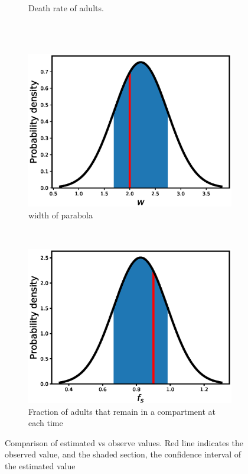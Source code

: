\documentclass[12pt, table]{article}
\begin{document}
\begin{figure}[H]
\begin{subfigure}[b]{0.45\textwidth}
       \caption{Death rate of adults.}
       \label{fig2f}
   \end{subfigure}\\
   ~ %
   \begin{subfigure}[b]{0.45\textwidth}
       \includegraphics[width=1\textwidth, height=0.24\textheight]{figexple2/fwidth}
        \caption{width of parabola}
       \label{fig2g}
   \end{subfigure}
   ~ %
   \begin{subfigure}[b]{0.45\textwidth}
       \includegraphics[width=1\textwidth, height=0.22\textheight]{figexple2/ffs}
        \caption{Fraction of adults  that remain in a compartment at each time}
       \label{fig2h}
   \end{subfigure}
\caption{Comparison of estimated vs observe values. Red line indicates the observed value, and the shaded section, the confidence interval of the estimated value}
   \label{fig2}
\end{figure}
\end{document}
